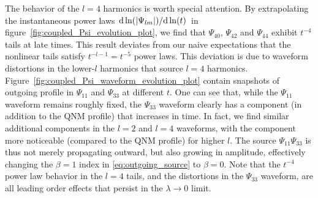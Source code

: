 \documentclass[reprint,aps,physrev,superscriptaddress,10pt,notitlepage,prd,nofootinbib,onecolumn]{revtex4-2}
\newcommand{\fref}[1]{figure~\ref{#1}}
\newcommand{\Fref}[1]{Figure~\ref{#1}}
\newcommand{\Revise}[1]{{\color{red} #1}}
\begin{document}
The behavior of the $l=4$ harmonics is worth special attention.
By extrapolating the instantaneous power laws $\dv*{\ln(|\Psi_{lm}|)}{\ln(t)}$ in \fref{fig:coupled_Psi_evolution_plot}, we find that $\Psi_{40}$, $\Psi_{42}$ and $\Psi_{44}$ exhibit $t^{-4}$ tails at late times.
This result deviates from our naive expectations that the nonlinear tails satisfy $t^{-l-1} = t^{-5}$ power laws.
This deviation is due to waveform distortions in the lower-$l$ harmonics that source $l=4$ harmonics.
\Fref{fig:coupled_Psi_waveform_evolution_plot} contain snapshots of outgoing profile in $\Psi_{11}$ and $\Psi_{33}$ at different $t$.
One can see that, while the $\Psi_{11}$ waveform remains roughly fixed, the $\Psi_{33}$ waveform clearly has a component (in addition to the QNM profile) that increases in time.
In fact, we find similar additional components in the $l=2$ and $l=4$ waveforms, with the component more noticeable (compared to the QNM profile) for higher $l$.
The source $\Psi_{11} \Psi_{33}$ is thus not merely propagating outward, but also growing in amplitude, effectively changing the $\beta = 1$ index in \eqref{eq:outgoing_source} to $\beta=0$.
\Revise{Note that the $t^{-4}$ power law behavior in the $l=4$ tails, and the distortions in the $\Psi_{33}$ waveform, are all leading order effects that persist in the $\lambda \to 0$ limit.}
\end{document}
